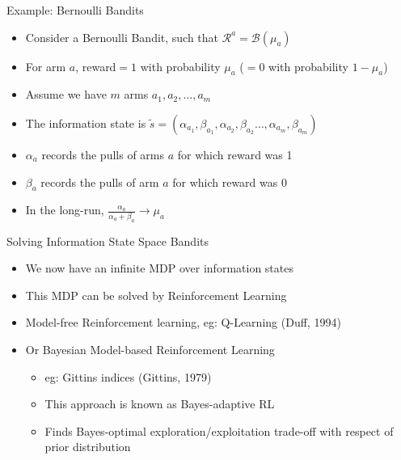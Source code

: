 \begin{frame}{Example: Bernoulli Bandits}
\begin{itemize}
    \item Consider a Bernoulli Bandit, such that $\mathcal{R}^a = \mathcal{B}(\mu_a)$
    \item For arm $a$, reward$=1$ with probability $\mu_a$ ($=0$ with probability $1 - \mu_a$)
    \item Assume we have $m$ arms $a_1, a_2, \ldots, a_m$
    \item The information state is $\tilde{s} = (\alpha_{a_1}, \beta_{a_1}, \alpha_{a_2}, \beta_{a_2} \ldots, \alpha_{a_m}, \beta_{a_m})$
    \item $\alpha_a$ records the pulls of arms $a$ for which reward was 1
    \item $\beta_a$ records the pulls of arm $a$ for which reward was 0
    \item In the long-run, $\frac{\alpha_a}{\alpha_a + \beta_a} \to \mu_a$
\end{itemize}
\end{frame}

\begin{frame}{Solving Information State Space Bandits}
\begin{itemize}
    \item We now have an infinite MDP over information states
    \item This MDP can be solved by Reinforcement Learning
    \item Model-free Reinforcement learning, eg: Q-Learning (Duff, 1994)
    \item Or Bayesian Model-based Reinforcement Learning
    \begin{itemize}
        \item eg: Gittins indices (Gittins, 1979)
        \item This approach is known as Bayes-adaptive RL
        \item Finds Bayes-optimal exploration/exploitation trade-off with respect
              of prior distribution
    \end{itemize}
\end{itemize}
\end{frame}

